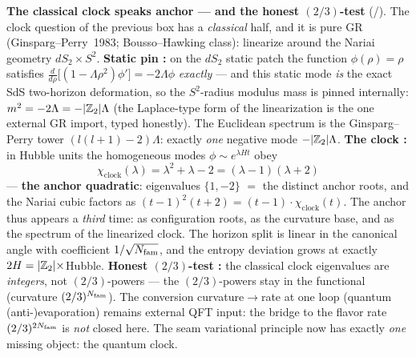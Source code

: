 \par\smallskip\noindent\textbf{The classical clock speaks anchor --- and the honest $(2/3)$-test} (\mE/\mC).
The clock question of the previous box has a \emph{classical} half, and it is pure GR
(Ginsparg--Perry~1983; Bousso--Hawking class): linearize around the Nariai geometry
$dS_2\times S^2$. \textbf{Static pin \mE:} on the $dS_2$ static patch the function $\phi(\rho)=\rho$
satisfies $\frac{d}{d\rho}\bigl[(1-\Lambda\rho^2)\phi'\bigr]=-2\Lambda\phi$ \emph{exactly} --- and this
static mode \emph{is} the exact SdS two-horizon deformation, so the $S^2$-radius modulus mass is pinned
internally: $m^2=-2\Lambda=-|\mathbb{Z}_2|\Lambda$ (the Laplace-type form of the linearization is the one
external GR import, typed honestly). The Euclidean spectrum is the Ginsparg--Perry tower
$(l(l+1)-2)\Lambda$: exactly \emph{one} negative mode $-|\mathbb{Z}_2|\Lambda$. \textbf{The clock \mE:} in
Hubble units the homogeneous modes $\phi\sim e^{\lambda Ht}$ obey
\[
  \boxed{\ \chi_{\mathrm{clock}}(\lambda)=\lambda^2+\lambda-2=(\lambda-1)(\lambda+2)\ }
\]
--- \textbf{the anchor quadratic}: eigenvalues $\{1,-2\}$ $=$ the distinct anchor roots, and the Nariai
cubic factors as $(t-1)^2(t+2)=(t-1)\cdot\chi_{\mathrm{clock}}(t)$. The anchor thus appears a
\emph{third} time: as configuration roots, as the curvature base, and as the spectrum of the linearized
clock. The horizon split is linear in the canonical angle with coefficient $1/\sqrt{N_{\mathrm{fam}}}$, and the
entropy deviation grows at exactly $2H=|\mathbb{Z}_2|\times$Hubble. \textbf{Honest $(2/3)$-test \mC:} the
classical clock eigenvalues are \emph{integers}, not $(2/3)$-powers --- the $(2/3)$-powers stay in the
functional (curvature $(2/3)^{N_{\mathrm{fam}}}$). The conversion curvature$\to$rate at one loop (quantum
(anti-)evaporation) remains external QFT input: the bridge to the flavor rate $(2/3)^{2N_{\mathrm{fam}}}$ is
\emph{not} closed here. The seam variational principle now has exactly \emph{one} missing object: the
quantum clock. 


